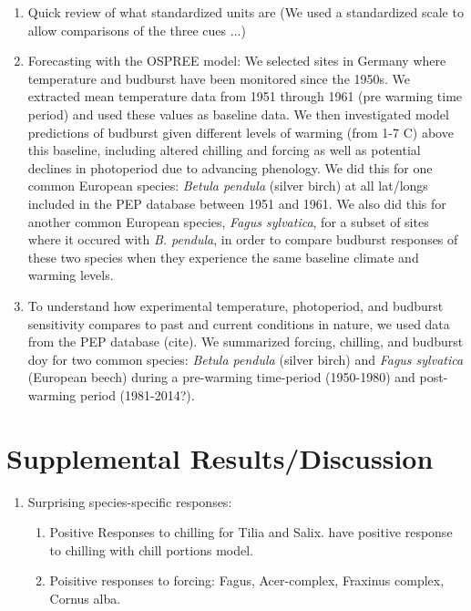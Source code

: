 \documentclass{article}
\begin{document}
\begin{enumerate}
\item Quick review of what standardized units are (We used a standardized scale to allow comparisons of the three cues ...)

\item Forecasting with the OSPREE model: We selected sites in Germany where temperature and budburst have been monitored since the 1950s. We extracted mean temperature data from 1951 through 1961 (pre warming time period) and used these values as baseline data. We then investigated model predictions of budburst given different levels of warming (from 1-7 \degree C) above this baseline, including altered chilling and forcing as well as potential declines in photoperiod due to advancing phenology. We did this for one common European species: \emph{Betula pendula} (silver birch) at all lat/longs included in the PEP database between 1951 and 1961. We also did this for another common European species, \emph{Fagus sylvatica}, for a subset of sites where it occured with \emph{B. pendula}, in order to compare budburst responses of these two species when they experience the same baseline climate and warming levels.

\item  To understand how experimental temperature, photoperiod, and budburst sensitivity compares to past and current conditions in nature, we used data from the PEP database (cite). We summarized forcing, chilling, and budburst doy for two common species: \emph{Betula pendula} (silver birch) and \emph{Fagus sylvatica} (European beech) during a pre-warming time-period (1950-1980) and post-warming period (1981-2014?). 

\end{enumerate}
\section*{Supplemental Results/Discussion}
\begin{enumerate}
\item Surprising species-specific responses: 
\begin{enumerate}
\item Positive Responses to chilling for Tilia and Salix.  have positive response to chilling with chill portions model.

\item Poisitive responses to forcing: Fagus, Acer-complex, Fraxinus complex, Cornus alba.
\end{enumerate}
\end{enumerate}
\end{document}
